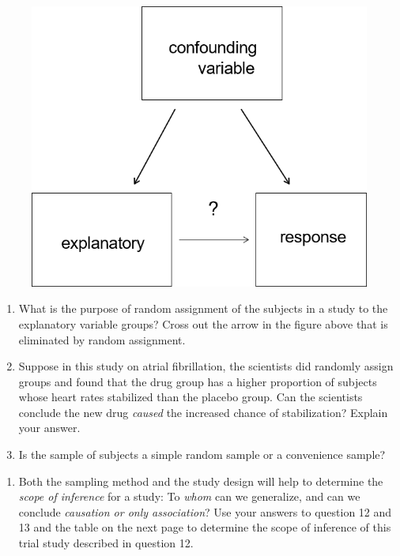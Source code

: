 \documentclass[
]{report}
\providecommand{\tightlist}{%
  \setlength{\itemsep}{0pt}\setlength{\parskip}{0pt}}
\begin{document}
\begin{figure}

{\centering \includegraphics[width=0.4\linewidth]{images/confounding} 

}

\end{figure}

\begin{enumerate}
\def\labelenumi{\arabic{enumi}.}
\setcounter{enumi}{10}
\item
  What is the purpose of random assignment of the subjects in a study to the explanatory variable groups? Cross out the arrow in the figure above that is eliminated by random assignment.
  \vspace{0.8in}
\item
  Suppose in this study on atrial fibrillation, the scientists did randomly assign groups and found that the drug group has a higher proportion of subjects whose heart rates stabilized than the placebo group. Can the scientists conclude the new drug \emph{caused} the increased chance of stabilization? Explain your answer.
  \vspace{0.8in}
\item
  Is the sample of subjects a simple random sample or a convenience sample?
\end{enumerate}

\vspace{0.3in}

\begin{enumerate}
\def\labelenumi{\arabic{enumi}.}
\setcounter{enumi}{13}
\tightlist
\item
  Both the sampling method and the study design will help to determine the \emph{scope of inference} for a study: To \emph{whom} can we generalize, and can we conclude \emph{causation or only association}? Use your answers to question 12 and 13 and the table on the next page to determine the scope of inference of this trial study described in question 12.
  \vspace{0.3in}
\end{enumerate}
\end{document}
